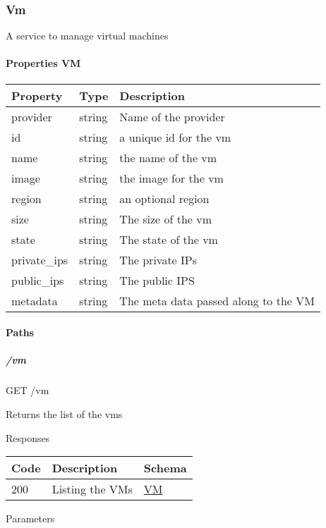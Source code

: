 \documentclass[9pt,]{article}
\let\oldparagraph\paragraph
\renewcommand{\paragraph}[1]{\oldparagraph{#1}\mbox{}}
\let\oldsubparagraph\subparagraph
\renewcommand{\subparagraph}[1]{\oldsubparagraph{#1}\mbox{}}
\begin{document}
\hypertarget{vm}{%
\subsubsection{Vm}\label{vm}}

A service to manage virtual machines

\hypertarget{properties-vm}{%
\paragraph{Properties VM}\label{properties-vm}}

\begin{longtable}[]{@{}lll@{}}
\toprule
Property & Type & Description\tabularnewline
\midrule
\endhead
provider & string & Name of the provider\tabularnewline
id & string & a unique id for the vm\tabularnewline
name & string & the name of the vm\tabularnewline
image & string & the image for the vm\tabularnewline
region & string & an optional region\tabularnewline
size & string & The size of the vm\tabularnewline
state & string & The state of the vm\tabularnewline
private\_ips & string & The private IPs\tabularnewline
public\_ips & string & The public IPS\tabularnewline
metadata & string & The meta data passed along to the VM\tabularnewline
\bottomrule
\end{longtable}

\hypertarget{paths-15}{%
\paragraph{Paths}\label{paths-15}}

\hypertarget{vm-1}{%
\subparagraph{/vm}\label{vm-1}}

GET /vm

Returns the list of the vms

Responses

\begin{longtable}[]{@{}lll@{}}
\toprule
Code & Description & Schema\tabularnewline
\midrule
\endhead
200 & Listing the VMs & \protect\hyperlink{vm}{VM}\tabularnewline
\bottomrule
\end{longtable}

Parameters
\end{document}

